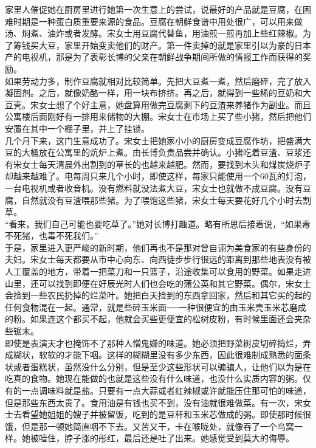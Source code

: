 家里人催促她在厨房里进行她第一次生意上的尝试，说最好的产品就是豆腐，在困难时期是一种蛋白质重要来源的食品。豆腐在朝鲜食谱中用处很广，可以用来做汤、焖煮、油炸或者发酵。宋女士用豆腐代替鱼，用油煎一煎再加上些红辣椒。为了筹钱买大豆，家里开始变卖他们的财产。第一件卖掉的就是家里引以为豪的日本产的电视机，那是为了表彰长博的父亲在朝鲜战争期间所做的情报工作而获得的奖励。\\

如果劳动力多，制作豆腐就相对比较简单。先把大豆煮一煮，然后磨碎，完了放入凝固剂。之后，就像奶酪一样，用一块布挤挤。再之后，就得到一些稀的豆奶和大豆壳。宋女士想了个好主意，她盘算用做完豆腐剩下的豆渣来养猪作为副业。而且公寓楼后面刚好有一排用来储物的大棚。宋女士在市场上买了些小猪，然后把他们安置在其中一个棚子里，并上了挂锁。\\

几个月下来，这门生意成功了。宋女士把她家小小的厨房变成豆腐作坊，把盛满大豆的大桶放在公寓里的炕炉上煮。由长博负责品尝并确认。小猪吃着豆渣、豆浆还有宋女士每天清晨外出割到的草长的也越来越肥。然而，要找到木头和煤炭烧炉子却越来越难了。电每周只来几个小时，即使这样，每家只能使用一个60瓦的灯泡，一台电视机或者收音机。没有燃料就没法煮大豆，宋女士也就做不成豆腐。没有豆腐，自然就没有豆渣喂那些猪。为了喂饱这些猪，宋女士每天要花好几个小时去割草。\\

“看来，我们自己可能也要吃草了。”她对长博打趣道。略有所思后接着说，“如果毒不死猪，也毒不死我们。”\\

于是，家里进入更严峻的新时期，他们再也不是那对曾自诩为美食家的有些身份的夫妇。宋女士每天都要从市中心向东、向西徒步步行很远的距离到那些地表没有被人工覆盖的地方，带着一把菜刀和一只篮子，沿途收集可以食用的野菜。如果走进山里，还可以找到即便在好辰光时人们也会吃的蒲公英和其它野菜。偶尔，宋女士会捡到一些农民扔掉的烂菜叶。她把白天捡到的东西拿回家，然后和其它买的起的任何食物混在一起。通常，就是些碎玉米面──一种很便宜的由玉米壳玉米芯磨成的粉。如果连这个都买不起，他就会买些更便宜的松树皮粉，有时候里面还会夹杂些锯末。\\

即使是表演天才也掩饰不了那种人憎鬼嫌的味道。她必须把野菜树皮切碎捣烂，弄成糊状，软软的才能下咽。这样的糊糊里没有多少东西，因此很难制成熟悉的面条状或者蛋糕状，虽然没什么分别，但是至少这些形状可以骗骗人，让他们以为是在吃真的食物。她现在能做的也就是这些没有什么味道，也没什么实质内容的粥。仅有的一点调味料就是盐。只要有一点大蒜或者红辣椒或许就能压住那可怕的味道，但是那些东西太贵了。食用油是有钱也买不到，没有油就很难做菜。有一次，宋女士去看望她姐姐的嫂子并被留饭，吃到的是豆秆和玉米芯做成的粥。即使那时候很饿，但是那一顿她简直咽不下去。又苦又干，卡在喉咙处，就像吞了一个鸟窝一样。她被噎住，脖子涨的彤红，最后还是吐了出来。她感觉受到莫大的侮辱。\\

